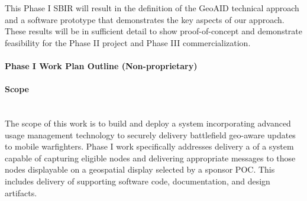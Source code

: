 \documentclass{sbir}
\begin{document}
{This Phase I SBIR will result in the definition of the GeoAID technical approach and a software prototype that demonstrates the key aspects of our approach. These results will be in sufficient detail to show proof-of-concept and demonstrate feasibility for the Phase II project and Phase III commercialization.}

\newpage 
\pagestyle{nonproprietary}
\paragraph{Phase I Work Plan Outline (Non-proprietary)}
\paragraph{Scope}~\\
The scope of this work is to build and deploy a system incorporating advanced usage management technology to securely delivery battlefield geo-aware updates to mobile warfighters.  Phase I work specifically addresses delivery a of a system capable of capturing eligible nodes and delivering appropriate messages to those nodes displayable on a geospatial display selected by a sponsor POC.  This includes delivery of supporting software code, documentation, and design artifacts.
\end{document}
